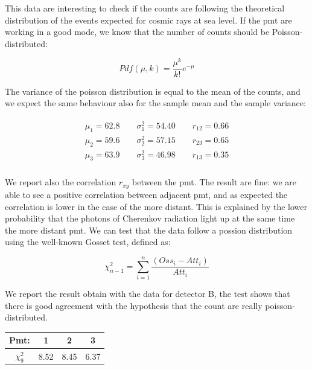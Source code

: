 This data are interesting to check if the counts are following the theoretical distribution of the events expected for cosmic rays at sea level. If the pmt are working in a good mode, we know that the number of counts should be Poisson-distributed:

\begin{equation}
Pdf(\mu,k) =  \frac{\mu^{k}}{k!} e^{-\mu}
\end{equation}

The variance of the poisson distribution is equal to the mean of the counts, and we expect the same behaviour also for the sample mean and the sample variance:

\begin{align*}
\begin{split}
\mu_{1} = 62.8	\qquad \sigma^{2}_{1} = 54.40 \qquad r_{12} = 0.66\\
\mu_{2} = 59.6	\qquad \sigma^{2}_{2} = 57.15 \qquad r_{23} = 0.65\\
\mu_{3} = 63.9	\qquad \sigma^{2}_{3} = 46.98 \qquad r_{13} = 0.35 \\
\end{split}
\end{align*}

We report also the correlation $r_{xy}$ between the pmt. The result are fine: we are able to see a positive correlation between adjacent pmt, and as expected the correlation is lower in the case of the more distant. This is explained by the lower probability that the photons of Cherenkov radiation light up at the same time the more distant pmt.
We can test that the data follow a possion distribution using the well-known Gosset test, defined as:

\begin{equation}
\chi^{2}_{n-1} = \sum_{i = 1}^{n} \dfrac{(Oss_{i} - Att_{i})}{Att_{i}}
\end{equation}

We report the result obtain with the data for detector B, the test shows that there is good agreement with the hypothesis that the count are really poisson-distributed.

\begingroup
\setlength{\tabcolsep}{8pt} %
\renewcommand{\arraystretch}{1.2} %
\begin{center}
\begin{tabular}{|c|c|c|c|}
\hline 
Pmt: & 1 & 2 & 3 \\ 
\hline
$\chi^{2}_{9}$ & 8.52 & 8.45 & 6.37 \\ 
\hline
\end{tabular} 
\end{center}
\endgroup

